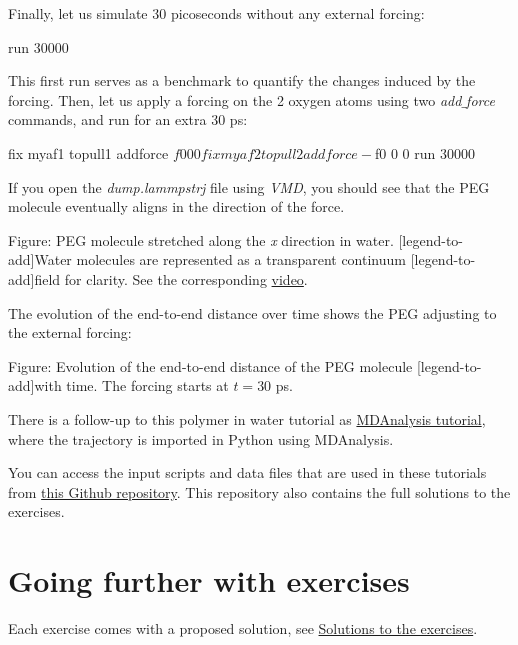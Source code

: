 \noindent Finally, let us simulate 30 picoseconds without any external forcing:

\begin{lcverbatim}
run 30000
\end{lcverbatim}

\noindent This first run serves as a benchmark to quantify the changes
induced by the forcing. Then, let us apply a forcing on the 2 oxygen
atoms using two \textit{add$\_$force} commands, and run for an extra 30 ps:

\begin{lcverbatim}
fix myaf1 topull1 addforce ${f0} 0 0
fix myaf2 topull2 addforce -${f0} 0 0
run 30000
\end{lcverbatim}

\noindent If you open the \textit{dump.lammpstrj} file using \textit{VMD}, you should
see that the PEG molecule eventually aligns in the direction
of the force.

\vspace{0.25cm} Figure: PEG molecule stretched along the \textit{x} direction in water.
[legend-to-add]Water molecules are represented as a transparent continuum 
[legend-to-add]field for clarity. See the corresponding \href{https://youtu.be/mjc6O6d9F-Y}{video}.

\vspace{0.25cm} \noindent The evolution of the end-to-end distance over time
shows the PEG adjusting to the external forcing:

\vspace{0.25cm} Figure: Evolution of the end-to-end distance of the PEG molecule
[legend-to-add]with time. The forcing starts at $t = 30$ ps.

\vspace{0.25cm} \noindent There is a follow-up to this polymer in water tutorial as \hyperref[mda-label]{MDAnalysis tutorial},
where the trajectory is imported in Python using MDAnalysis.

\vspace{0.25cm} \noindent You can access the input scripts and data files that
are used in these tutorials from \href{https://github.com/lammpstutorials/lammpstutorials-inputs/}{this Github repository}.
This repository also contains the full solutions to the exercises.

\section{Going further with exercises}
\noindent Each exercise comes with a proposed solution, 
see \hyperref[solutions-label]{Solutions to the exercises}.

